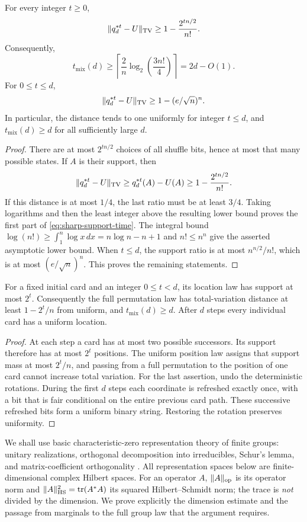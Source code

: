 \begin{lemma}\label{lem:lower}
For every integer $t\ge0$,
\begin{equation}\label{eq:exact-support-lower}
 \|q_d^{*t}-U\|_{\mathrm{TV}}\ge 1-\frac{2^{tn/2}}{n!}.
\end{equation}
Consequently,
\begin{equation}\label{eq:sharp-support-time}
 t_{\mathrm{mix}}(d)\ge
 \left\lceil\frac2n\log_2\left(\frac{3n!}{4}\right)\right\rceil
 =2d-O(1).
\end{equation}
For $0\le t\le d$,
\[
 \|q_d^{*t}-U\|_{\mathrm{TV}}\ge1-(e/\sqrt n)^n.
\]
In particular, the distance tends to one uniformly for integer $t\le d$,
and $t_{\mathrm{mix}}(d)\ge d$ for all sufficiently large $d$.
\end{lemma}
\begin{proof}
There are at most $2^{tn/2}$ choices of all shuffle bits, hence at most
that many possible states. If $A$ is their support, then
\[
 \|q_d^{*t}-U\|_{\mathrm{TV}}\ge q_d^{*t}(A)-U(A)
 \ge1-\frac{2^{tn/2}}{n!}.
\]
If this distance is at most $1/4$, the last ratio must be at least
$3/4$. Taking logarithms and then the least integer above the resulting
lower bound proves the first part of \eqref{eq:sharp-support-time}.
The integral bound
$\log(n!)\ge\int_1^n\log x\,dx=n\log n-n+1$
and $n!\le n^n$ give the asserted asymptotic lower bound. When
$t\le d$, the support ratio is at most $n^{n/2}/n!$, which is at most
$(e/\sqrt n)^n$. This proves the remaining statements.
\end{proof}

\begin{lemma}\label{lem:one-card-lower}
For a fixed initial card and an integer $0\le t<d$, its location law
has support at most $2^t$. Consequently the full permutation law has
total-variation distance at least $1-2^t/n$ from uniform, and
$t_{\mathrm{mix}}(d)\ge d$. After $d$ steps every individual card
has a uniform location.
\end{lemma}
\begin{proof}
At each step a card has at most two possible successors. Its support
therefore has at most $2^t$ positions. The uniform position law assigns
that support mass at most $2^t/n$, and passing from a full permutation
to the position of one card cannot increase total variation.
For the last assertion, undo the deterministic rotations. During the
first $d$ steps each coordinate is refreshed exactly once, with a bit
that is fair conditional on the entire previous card path. These
successive refreshed bits form a uniform binary string. Restoring the
rotation preserves uniformity.
\end{proof}

We shall use basic characteristic-zero representation theory of finite
groups: unitary realizations, orthogonal decomposition into irreducibles,
Schur's lemma, and matrix-coefficient orthogonality
\cite{etingof,sagan}. All representation spaces below are finite-dimensional
complex Hilbert spaces. For an operator $A$, $\|A\|_{\mathrm{op}}$ is its operator
norm and $\|A\|_{\mathrm{HS}}^2=\operatorname{tr}(A^*A)$ its squared Hilbert--Schmidt norm;
the trace is \emph{not} divided by the dimension. We prove explicitly the
dimension estimate and the passage from marginals to the full group law
that the argument requires.
